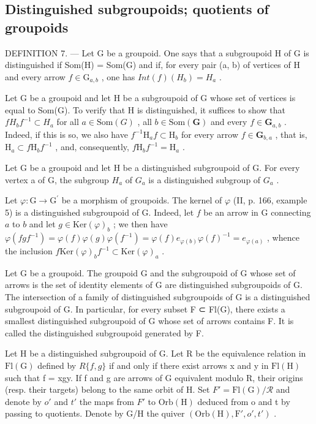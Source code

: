 \subsection{Distinguished subgroupoids; quotients of groupoids}

DEFINITION 7. --- Let G be a groupoid. One says that a subgroupoid H of G is distinguished if Som(H) = Som(G) and if, for every pair (a, b) of vertices of H and every arrow \(f \in \mathrm{G}_{a,b}\) , one has \(Int(f)(H_b) = H_a\) .

Let G be a groupoid and let H be a subgroupoid of G whose set of vertices is equal to Som(G). To verify that H is distinguished, it suffices to show that \(fH_{b}f^{-1} \subset H_{a}\) for all \(a \in \text{Som}(G)\) , all \(b \in \text{Som}(\mathbf{G})\) and every \(f \in \mathbf{G}_{a,b}\) . Indeed, if this is so, we also have \(f^{-1}\mathrm{H}_a f \subset \mathrm{H}_b\) for every arrow \(f \in \mathbf{G}_{b,a}\) , that is, \(\mathrm{H}_a \subset f\mathrm{H}_b f^{-1}\) , and, consequently, \(f\mathrm{H}_b f^{-1} = \mathrm{H}_a\) .

Let G be a groupoid and let H be a distinguished subgroupoid of G. For every vertex a of G, the subgroup \(H_{a}\) of \(G_{a}\) is a distinguished subgroup of \(G_{a}\) .

Let \(\varphi\colon\mathrm{G}\to\mathrm{G}^{\prime}\) be a morphism of groupoids. The kernel of \(\varphi\) (II, p. 166, example 5) is a distinguished subgroupoid of G. Indeed, let \(f\) be an arrow in G connecting \(a\) to \(b\) and let \(g\in\mathrm{Ker}(\varphi)_{b}\) ; we then have \(\varphi(fgf^{-1})=\varphi(f)\varphi(g)\varphi(f^{-1})=\varphi(f)e_{\varphi(b)}\varphi(f)^{-1}=e_{\varphi(a)}\) , whence the inclusion \(f\mathrm{Ker}(\varphi)_{b}f^{-1}\subset\mathrm{Ker}(\varphi)_{a}\) .

Let G be a groupoid. The groupoid G and the subgroupoid of G whose set of arrows is the set of identity elements of G are distinguished subgroupoids of G. The intersection of a family of distinguished subgroupoids of G is a distinguished subgroupoid of G. In particular, for every subset F ⊂ Fl(G), there exists a smallest distinguished subgroupoid of G whose set of arrows contains F. It is called the distinguished subgroupoid generated by F.

Let H be a distinguished subgroupoid of G. Let R be the equivalence relation in \(\mathrm{Fl}(\mathrm{G})\) defined by \(R\{f,g\}\) if and only if there exist arrows x and y in \(\mathrm{Fl}(\mathrm{H})\) such that f = xgy. If f and g are arrows of G equivalent modulo R, their origins (resp. their targets) belong to the same orbit of H. Set \(F' = \mathrm{Fl}(\mathrm{G}) / \mathcal{R}\) and denote by \(o'\) and \(t'\) the maps from \(F'\) to \(\mathrm{Orb}(\mathrm{H})\) deduced from o and t by passing to quotients. Denote by G/H the quiver \((\mathrm{Orb}(\mathrm{H}), \mathrm{F}', o', t')\) .

